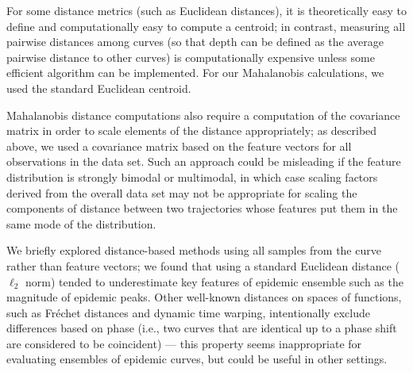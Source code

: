 \documentclass[fleqn,10pt,lineno]{wlpeerj}
\begin{document}

For some distance metrics (such as Euclidean distances), it is theoretically easy to define and computationally easy to compute a centroid; in contrast, measuring all pairwise distances among curves (so that depth can be defined as the average pairwise distance to other curves) is computationally expensive unless some efficient algorithm can be implemented. For our Mahalanobis calculations, we used the standard Euclidean centroid.

Mahalanobis distance computations also require a computation of the covariance matrix in order to scale elements of the distance appropriately; as described above, we used a covariance matrix based on the feature vectors for all observations in the data set. Such an approach could be misleading if the feature distribution is strongly bimodal or multimodal, in which case scaling factors derived from the overall data set may not be appropriate for scaling the components of distance between two trajectories whose features put them in the same mode of the distribution.

We briefly explored distance-based methods using all samples from the curve rather than feature vectors; we found that using a standard Euclidean distance ($\ell_2$ norm) tended to underestimate key features of epidemic ensemble such as the magnitude of epidemic peaks. Other well-known distances on spaces of functions, such as Fréchet distances and dynamic time warping, intentionally exclude differences based on phase (i.e., two curves that are identical up to a phase shift are considered to be coincident) --- this property seems inappropriate for evaluating ensembles of epidemic curves, but could be useful in other settings.

\end{document}

